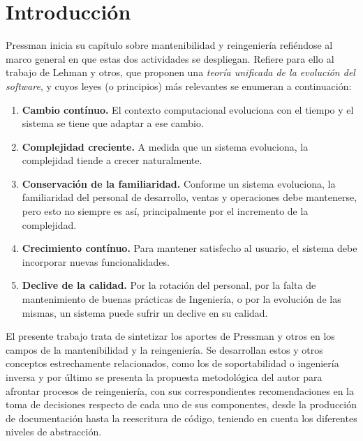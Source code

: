 \section{Introducción}

Pressman inicia su capítulo sobre mantenibilidad y reingeniería 
refiéndose al marco general en que estas dos actividades se despliegan. 
Refiere para ello al trabajo de Lehman y otros,
que proponen una \textit{teoría unificada de la evolución del software},
y cuyos leyes (o principios) más relevantes se enumeran a continuación:

\begin{enumerate}
    \item \textbf{Cambio contínuo.}
    El contexto computacional evoluciona con el tiempo y el sistema se tiene que
    adaptar a ese cambio.
    \item \textbf{Complejidad creciente.}
    A medida que un sistema evoluciona, la complejidad tiende a crecer 
    naturalmente.
    \item \textbf{Conservación de la familiaridad.}
    Conforme un sistema evoluciona, la familiaridad del personal de desarrollo,
    ventas y operaciones debe mantenerse, pero esto no siempre es así,
    principalmente por el incremento de la complejidad.
    \item \textbf{Crecimiento contínuo.}
    Para mantener satisfecho al usuario, el sistema debe incorporar nuevas 
    funcionalidades.
    \item \textbf{Declive de la calidad.}
    Por la rotación del personal, 
    por la falta de mantenimiento de buenas prácticas de Ingeniería,
    o por la evolución de las mismas,
    un sistema puede sufrir un declive en su calidad.
\end{enumerate}

El presente trabajo trata de sintetizar los aportes de Pressman y otros
en los campos de la mantenibilidad y la reingeniería.
Se desarrollan estos y otros conceptos estrechamente relacionados,
como los de soportabilidad o ingeniería inversa y
por último se presenta la propuesta metodológica 
del autor para afrontar procesos de reingeniería,
con sus correspondientes recomendaciones en la toma de decisiones
respecto de cada uno de sus componentes,
desde la producción de documentación
hasta la reescritura de código,
teniendo en cuenta los diferentes niveles de abstracción.